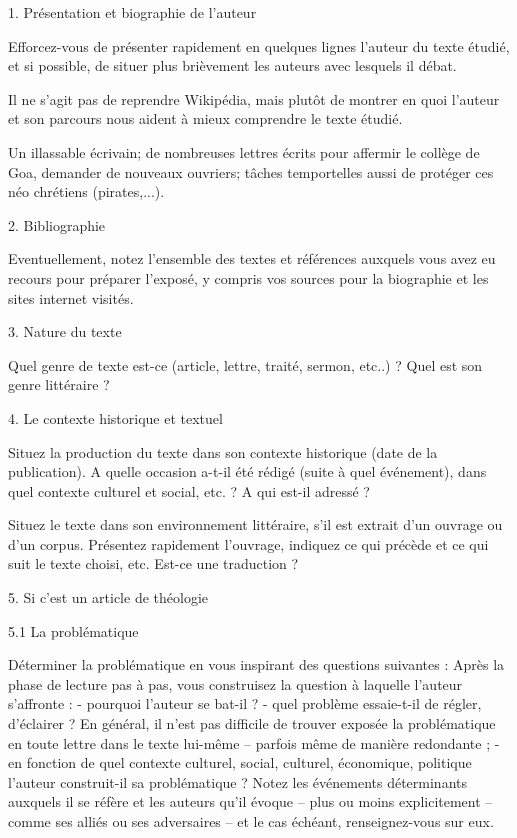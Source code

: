 1.	Présentation et biographie de l’auteur 

Efforcez-vous de présenter rapidement en quelques lignes l’auteur du texte étudié, et si possible, de situer plus brièvement les auteurs avec lesquels il débat.

Il ne s’agit pas de reprendre Wikipédia, mais plutôt de montrer en quoi l’auteur et son parcours nous aident à mieux comprendre le texte étudié.

Un illassable écrivain; de nombreuses lettres écrits pour affermir le collège de Goa, demander de nouveaux ouvriers; tâches temportelles aussi de protéger ces néo chrétiens (pirates,...).


2.	Bibliographie

Eventuellement, notez l’ensemble des textes et références auxquels vous avez eu recours pour préparer l’exposé, y compris vos sources pour la biographie et les sites internet visités. 

3.	Nature du texte

Quel genre de texte est-ce (article, lettre, traité, sermon, etc..) ? Quel est son genre littéraire ?

4.	Le contexte historique et textuel

Situez la production du texte dans son contexte historique (date de la publication). A quelle occasion a-t-il été rédigé (suite à quel événement), dans quel contexte culturel et social, etc. ? A qui est-il adressé ?

Situez le texte dans son environnement littéraire, s’il est extrait d’un ouvrage ou d’un corpus. Présentez rapidement l’ouvrage, indiquez ce qui précède et ce qui suit le texte choisi, etc. Est-ce une traduction ?

5.	Si c’est un article de théologie


	5.1 La problématique 

Déterminer la problématique en vous inspirant des questions suivantes :
Après la phase de lecture pas à pas, vous construisez la question à laquelle l’auteur s’affronte :
-	pourquoi l’auteur se bat-il ?
-	quel problème essaie-t-il de régler, d’éclairer ? En général, il n’est pas difficile de trouver exposée la problématique en toute lettre dans le texte lui-même – parfois même de manière redondante ;
-	en fonction de quel contexte culturel, social, culturel, économique, politique l’auteur construit-il sa problématique ? Notez les événements déterminants auxquels il se réfère et les auteurs qu’il évoque – plus ou moins explicitement – comme ses alliés ou ses adversaires – et le cas échéant, renseignez-vous sur eux. 

